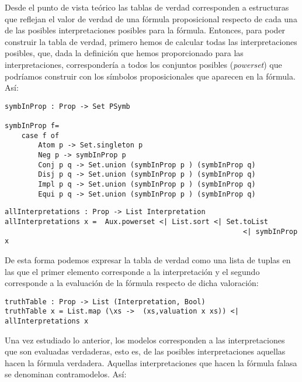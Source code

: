 \documentclass[a4paper]{report}
\begin{document}
Desde el punto de vista teórico las tablas de verdad corresponden a estructuras que reflejan el valor de verdad de una fórmula proposicional respecto de cada una de las posibles interpretaciones posibles para la fórmula. Entonces, para poder construir la tabla de verdad, primero hemos de calcular todas las interpretaciones posibles, que, dada la definición que hemos proporcionado para las interpretaciones, correspondería a todos los conjuntos posibles (\textit{powerset}) que podríamos construir con los símbolos proposicionales que aparecen en la fórmula. Así:\\

\newpage

\begin{lstlisting}[caption= Función para extraer los símbolos proposicionales que intervienen en una fórmula]
symbInProp : Prop -> Set PSymb

symbInProp f=
    case f of
        Atom p -> Set.singleton p
        Neg p -> symbInProp p
        Conj p q -> Set.union (symbInProp p ) (symbInProp q)
        Disj p q -> Set.union (symbInProp p ) (symbInProp q)
        Impl p q -> Set.union (symbInProp p ) (symbInProp q)
        Equi p q -> Set.union (symbInProp p ) (symbInProp q)
\end{lstlisting}

\begin{lstlisting}[caption= Función para extraer las posibles interpretaciones para una fórmula propsicional]
allInterpretations : Prop -> List Interpretation
allInterpretations x =  Aux.powerset <| List.sort <| Set.toList 
                                                         <| symbInProp x
\end{lstlisting}

De esta forma podemos expresar la tabla de verdad como una lista de tuplas en las que el primer elemento corresponde a la interpretación y el segundo corresponde a la evaluación de la fórmula respecto de dicha valoración:\\

\begin{lstlisting}[caption= Función para la construcción de la tabla de verdad de una fórmula]
truthTable : Prop -> List (Interpretation, Bool)
truthTable x = List.map (\xs ->  (xs,valuation x xs)) <| allInterpretations x
\end{lstlisting}

Una vez estudiado lo anterior, los modelos corresponden a las interpretaciones que son evaluadas verdaderas, esto es, de las posibles interpretaciones aquellas hacen la fórmula verdadera. Aquellas interpretaciones que hacen la fórmula falasa se denominan contramodelos. Así:\\
\end{document}
